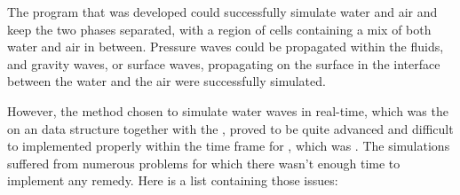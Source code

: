 
The program that was developed could successfully simulate water and air and keep the two phases separated, with a region of cells containing a mix of both water and air in between. Pressure waves could be propagated within the fluids, and gravity waves, or surface waves, propagating on the surface in the interface between the water and the air were successfully simulated.


However, the method chosen to simulate water waves in real-time, which was the \FVM on an \octree data structure together with the \VOF, proved to be quite advanced and difficult to implemented properly within the time frame for \thismasterthesiswork, which was \masterthesisworktime. The simulations suffered from numerous problems for which there wasn't enough time to implement any remedy. Here is a list containing those issues:


